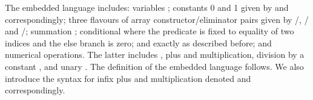 The embedded language  includes: variables ; constants 0 and 1 given
by  and  correspondingly; three flavours of array constructor/eliminator
pairs given by /, / and /;
summation ; conditional  where the predicate is fixed to equality
of two indices and the else branch is zero;  and  exactly
as described before; and numerical operations.  The latter includes ,
plus and multiplication, division by a constant , and unary .
The definition of the embedded language  follows.  We also introduce the
syntax for infix plus and multiplication denoted  and  correspondingly.
\begin{code}%
%
\>[2]\AgdaSpace{}%
\AgdaSpace{}%
\AgdaSymbol{:}\AgdaSpace{}%
\AgdaSpace{}%
\AgdaSpace{}%
\AgdaSpace{}%
\AgdaSpace{}%
\AgdaSpace{}%
\<%
\\
\>[2][@{}l@{\AgdaIndent{0}}]%
\>[4]%
\>[15]\AgdaSymbol{:}\AgdaSpace{}%
\AgdaSpace{}%
\AgdaSpace{}%
\AgdaSpace{}%
\AgdaSpace{}%
\AgdaSpace{}%
\AgdaSpace{}%
\<%
\\
%
\>[4]%
\>[15]\AgdaSymbol{:}\AgdaSpace{}%
\AgdaSpace{}%
\AgdaSpace{}%
\AgdaSymbol{(}\AgdaSpace{}%
\AgdaSymbol{)}\<%
\\
%
\>[4]%
\>[15]\AgdaSymbol{:}\AgdaSpace{}%
\AgdaSpace{}%
\AgdaSpace{}%
\AgdaSymbol{(}\AgdaSpace{}%
\AgdaSymbol{)}\<%
\\
%
\\[\AgdaEmptyExtraSkip]%
%
\>[4]%
\>[15]\AgdaSymbol{:}\AgdaSpace{}%
\AgdaSpace{}%
\AgdaSymbol{(}\AgdaSpace{}%
\AgdaSpace{}%
\AgdaSpace{}%
\AgdaSymbol{)}\AgdaSpace{}%
\AgdaSymbol{(}\AgdaSpace{}%
\AgdaSymbol{)}\AgdaSpace{}%

\end{code}
